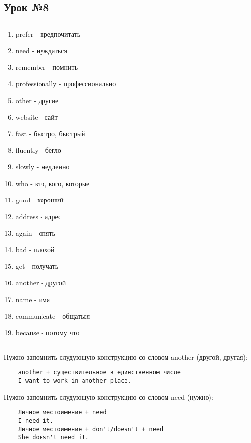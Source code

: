 \subsection{Урок №8}

\subsection*{}
\begin{multicols}{2}
    \begin{enumerate}\setlength{\itemsep}{0pt}
        \item prefer - предпочитать
        \item need - нуждаться
        \item remember - помнить
        \item professionally - профессионально
        \item other - другие
        \item website - сайт
        \item fast - быстро, быстрый
        \item fluently - бегло
        \item slowly - медленно
        \item who - кто, кого, которые
        \item good - хороший
        \item address - адрес
        \item again - опять
        \item bad - плохой
        \item get - получать
        \item another - другой
        \item name - имя
        \item communicate - общаться
        \item because - потому что
    \end{enumerate}
\end{multicols}

\subsection*{}
Нужно запомнить слудующую конструкцию со словом another (другой, другая):
\begin{verbatim}
    another + существительное в единственном числе
    I want to work in another place.
\end{verbatim}

Нужно запомнить слудующую конструкцию со словом need (нужно):
\begin{verbatim}
    Личное местоимение + need
    I need it.
    Личное местоимение + don't/doesn't + need
    She doesn't need it.
\end{verbatim}